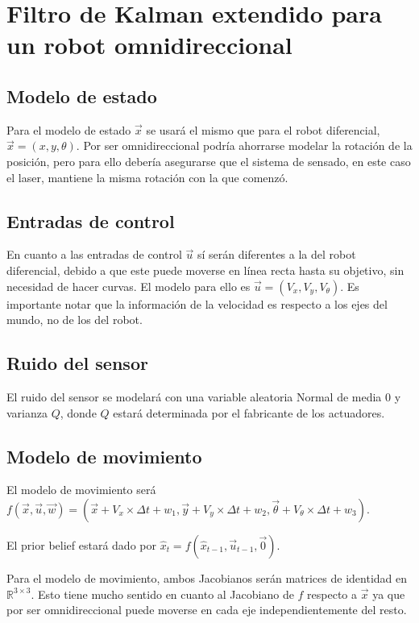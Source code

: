 \documentclass[a4paper]{article}
\newcommand{\real}{\ensuremath{\mathbb{R}}}
\theoremstyle{plain}
\theoremstyle{remark}
\theoremstyle{definition}
\begin{document}
\section{Filtro de Kalman extendido para un robot omnidireccional}

\subsection*{Modelo de estado}

Para el modelo de estado $\vec{x}$ se usará el mismo que para el robot diferencial, $\vec{x} = (x, y, \theta)$. Por ser omnidireccional podría ahorrarse modelar la rotación de la posición, pero para ello debería asegurarse que el sistema de sensado, en este caso el laser, mantiene la misma rotación con la que comenzó.

\subsection*{Entradas de control}

En cuanto a las entradas de control $\vec{u}$ sí serán diferentes a la del robot diferencial, debido a que este puede moverse en línea recta hasta su objetivo, sin necesidad de hacer curvas. El modelo para ello es $\vec{u} = (V_x, V_y, V_{\theta})$. Es importante notar que la información de la velocidad es respecto a los ejes del mundo, no de los del robot.

\subsection*{Ruido del sensor}

El ruido del sensor se modelará con una variable aleatoria Normal de media 0 y varianza $Q$, donde $Q$ estará determinada por el fabricante de los actuadores.

\subsection*{Modelo de movimiento}

El modelo de movimiento será $f(\vec{x}, \vec{u}, \vec{w}) = (\vec{x} + V_x \times \Delta t + w_1, \vec{y} + V_y \times \Delta t + w_2, \vec{\theta} + V_{\theta} \times \Delta t + w_3)$.

El prior belief estará dado por $\hat{x}_t = f(\hat{x}_{t - 1}, \vec{u}_{t - 1}, \vec{0})$.

Para el modelo de movimiento, ambos Jacobianos serán matrices de identidad en $\real^{3 \times 3}$. Esto tiene mucho sentido en cuanto al Jacobiano de $f$ respecto a $\vec{x}$ ya que por ser omnidireccional puede moverse en cada eje independientemente del resto.
\end{document}
